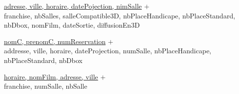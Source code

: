 \documentclass[a4paper,sffamily,12pt]{article}
\begin{document}
\vspace{1cm}

\underline{adresse, ville, horaire, datePojection, nimSalle} $+$ \\
franchise, nbSalles, salleCompatible3D, nbPlaceHandicape, nbPlaceStandard, nbDbox, nomFilm, dateSortie, diffusionEn3D\\

\vspace{1cm}

\underline{nomC, prenomC, numReservation} $+$ \\
addresse, ville, horaire, dateProjection, numSalle, nbPlaceHandicape, nbPlaceStandard, nbDbox\\
	
\vspace{1cm}

\underline{horaire, nomFilm, adresse, ville} $+$ \\
franchise, numSalle, nbSalle\\
\end{document}
